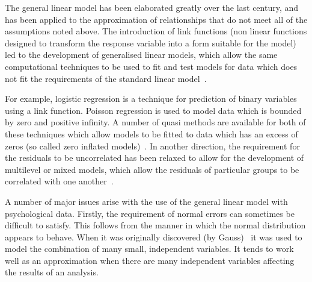 

The general linear model has been elaborated greatly over the last century, and has been applied to the approximation of relationships that do not meet all of the assumptions noted above\cite{gelman2007data}. The introduction of link functions (non linear functions designed to transform the response variable into a form suitable for the model)  led to the development of generalised linear models, which allow the same computational techniques to be used to fit and test models for data which does not fit the requirements of the standard linear model~\cite{mccullagh1989generalized}.

For example, logistic regression is a technique for prediction of binary
 variables using a link function. Poisson regression is used to model data
 which is bounded by zero and positive infinity. A number of quasi methods
 are available for both of these techniques which allow models to be fitted
 to  data which has an excess of zeros (so called zero inflated models)~\cite{gelman2007data,venables2002modern}. In another direction, the
 requirement for the residuals to be uncorrelated has been relaxed to allow for the development of multilevel or mixed models, which allow the residuals of particular groups to be correlated with one another~\cite{gelman2007data}. 

A number of major issues arise with the use of the general linear model with psychological data. Firstly, the requirement of normal errors can sometimes be difficult to satisfy. This follows from the manner in which the normal distribution appears to behave. When it was originally discovered (by Gauss)~\cite{stigler1986history} it was used to model the combination of many small, independent variables. It tends to work well as an approximation when there are many independent variables affecting the results of an analysis.

